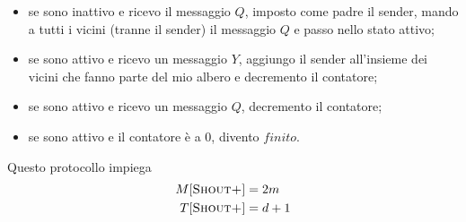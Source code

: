 \documentclass[12pt, answers]{exam}
\begin{document}
\begin{questions}
\begin{parts}
\begin{solution}
\begin{itemize}
				\item se sono inattivo e ricevo il messaggio $Q$, imposto come padre il sender, mando a tutti i vicini (tranne il sender) il messaggio $Q$ e passo nello stato attivo;
				\item se sono attivo e ricevo un messaggio $Y$, aggiungo il sender all'insieme dei vicini che fanno parte del mio albero e decremento il contatore;
				\item se sono attivo e ricevo un messaggio $Q$, decremento il contatore;
				\item se sono attivo e il contatore è a 0, divento $finito$.
			\end{itemize}
			
			Questo protocollo impiega
			\begin{align*}
				M[\textsc{Shout+}] &= 2m \\
				T[\textsc{Shout+}] &= d + 1
			\end{align*}
		\end{solution}
	\end{parts}
\end{questions}
\end{document}
